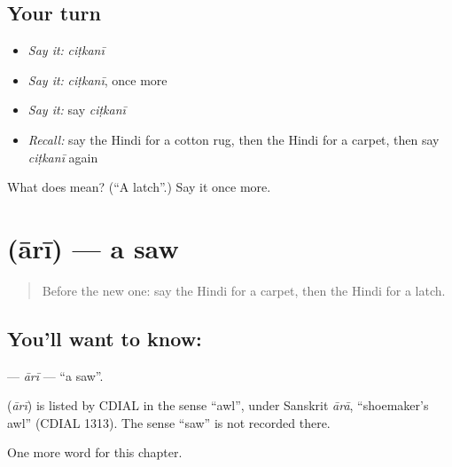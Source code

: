 \subsection*{Your turn}
\begin{itemize}
\raggedright
  \item \emph{Say it:} \emph{ciṭkanī}
  \item \emph{Say it:} \emph{ciṭkanī}, once more
  \item \emph{Say it:} say \emph{ciṭkanī}
  \item \emph{Recall:} say the Hindi for a cotton rug, then the Hindi for a carpet, then say \emph{ciṭkanī} again
\end{itemize}

\begin{tcolorbox}[breakable,colback=teal!4,colframe=teal!35!black,title={Before you move on}]
What does  mean? (\textquotedblleft{}A latch\textquotedblright{}.) Say it once more.
\end{tcolorbox}
\section[\texorpdfstring{\hi{आरी} (ārī)}{आरी (ārī)}]{ (ārī) — a saw}

\label{lesson:HI-C266-ari}



\begin{quote}
Before the new one: say the Hindi for a carpet, then the Hindi for a latch.
\end{quote}

\subsection*{You'll want to know: }
\textbf{} — \emph{ārī} — \textquotedblleft{}a saw\textquotedblright{}.

\begin{cousinweb}
\textbf{} (\emph{ārī}) is listed by CDIAL in the sense \textquotedblleft{}awl\textquotedblright{}, under Sanskrit \emph{ārā}, \textquotedblleft{}shoemaker's awl\textquotedblright{} (CDIAL 1313). The sense \textquotedblleft{}saw\textquotedblright{} is not recorded there.
\end{cousinweb}

\begin{grammarlens}[title={What you've built}]
One more word for this chapter.
\end{grammarlens}

